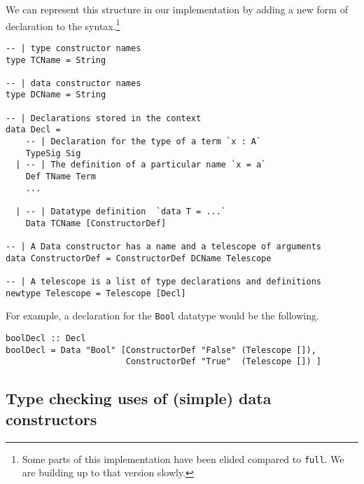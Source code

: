 \documentclass{article}
\theoremstyle{definition}
\begin{document}
We can represent this structure in our implementation by adding a new form of
declaration to the syntax.\footnote{Some parts of this implementation have
  been elided compared to \texttt{full}. We are building up to that version
  slowly.}

\begin{verbatim}
-- | type constructor names
type TCName = String

-- | data constructor names
type DCName = String

-- | Declarations stored in the context
data Decl =
    -- | Declaration for the type of a term `x : A`
    TypeSig Sig
  | -- | The definition of a particular name `x = a`
    Def TName Term
    ...

  | -- | Datatype definition  `data T = ...`
    Data TCName [ConstructorDef]

-- | A Data constructor has a name and a telescope of arguments
data ConstructorDef = ConstructorDef DCName Telescope

-- | A telescope is a list of type declarations and definitions
newtype Telescope = Telescope [Decl]

\end{verbatim}

\noindent For example, a declaration for the \texttt{Bool} datatype would be the following.
\begin{verbatim}
boolDecl :: Decl
boolDecl = Data "Bool" [ConstructorDef "False" (Telescope []),
                        ConstructorDef "True"  (Telescope []) ]
\end{verbatim}


\subsection{Type checking uses of (simple) data constructors}




\end{document}
